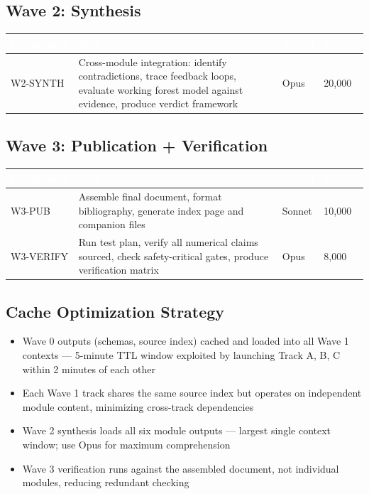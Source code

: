 \documentclass[11pt,letterpaper]{article}
\newcommand{\tableheader}[1]{\textbf{\sffamily\textcolor{white}{#1}}}
\begin{document}
\subsection{Wave 2: Synthesis}

\begin{center}
\begin{tabularx}{\textwidth}{L{2.5cm}XC{1.5cm}C{2cm}}
\toprule
{}
\tableheader{Component} & \tableheader{Task} & \tableheader{Model} & \tableheader{Tokens} \\
\midrule
W2-SYNTH & Cross-module integration: identify contradictions, trace feedback loops, evaluate working forest model against evidence, produce verdict framework & Opus & 20,000 \\
\bottomrule
\end{tabularx}
\end{center}

\subsection{Wave 3: Publication + Verification}

\begin{center}
\begin{tabularx}{\textwidth}{L{2.5cm}XC{1.5cm}C{2cm}}
\toprule
{}
\tableheader{Component} & \tableheader{Task} & \tableheader{Model} & \tableheader{Tokens} \\
\midrule
W3-PUB & Assemble final document, format bibliography, generate index page and companion files & Sonnet & 10,000 \\
W3-VERIFY & Run test plan, verify all numerical claims sourced, check safety-critical gates, produce verification matrix & Opus & 8,000 \\
\bottomrule
\end{tabularx}
\end{center}

\subsection{Cache Optimization Strategy}

\begin{itemize}[leftmargin=2em]
\item Wave 0 outputs (schemas, source index) cached and loaded into all Wave 1 contexts --- 5-minute TTL window exploited by launching Track A, B, C within 2 minutes of each other
\item Each Wave 1 track shares the same source index but operates on independent module content, minimizing cross-track dependencies
\item Wave 2 synthesis loads all six module outputs --- largest single context window; use Opus for maximum comprehension
\item Wave 3 verification runs against the assembled document, not individual modules, reducing redundant checking
\end{itemize}
\end{document}
